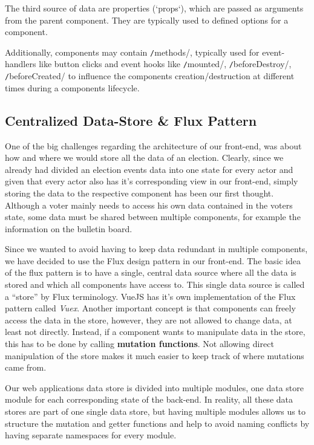 The third source of data are properties (`props`), which are passed as arguments from the parent component. They are typically used to defined options for a component.

Additionally, components may contain \texttt/methods/, typically used for event-handlers like button clicks and event hooks like \texttt/mounted/, \texttt/beforeDestroy/, \texttt/beforeCreated/ to influence the components creation/destruction at different times during a components lifecycle.

\subsection{Centralized Data-Store \& Flux Pattern}
One of the big challenges regarding the architecture of our front-end, was about how and where we would store all the data of an election. Clearly, since we already had divided an election events data into one state for every actor and given that every actor also has it's corresponding view in our front-end, simply storing the data to the respective component has been our first thought. Although a voter mainly needs to access his own data contained in the voters state, some data must be shared between multiple components, for example the information on the bulletin board.

Since we wanted to avoid having to keep data redundant in multiple components, we have decided to use the Flux design pattern in our front-end. The basic idea of the flux pattern is to have a single, central data source where all the data is stored and which all components have access to. This single data source is called a "`store"' by Flux terminology. VueJS has it's own implementation of the Flux pattern called \textit{Vuex}. Another important concept is that components can freely access the data in the store, however, they are not allowed to change data, at least not directly. Instead, if a component wants to manipulate data in the store, this has to be done by calling \textbf{mutation functions}. Not allowing direct manipulation of the store makes it much easier to keep track of where mutations came from.

Our web applications data store is divided into multiple modules, one data store module for each corresponding state of the back-end. In reality, all these data stores are part of one single data store, but having multiple modules allows us to structure the mutation and getter functions and help to avoid naming conflicts by having separate namespaces for every module.

